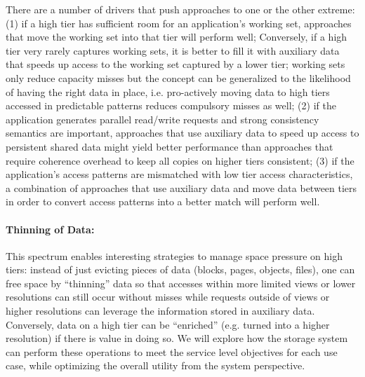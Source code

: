 There are a
number of drivers that push approaches to one or the other extreme:
(1) if a high tier has sufficient room for an application's working
set, approaches that move the working set into that tier will perform
well; Conversely, if a high tier very rarely captures working sets,
it is better to fill it with auxiliary data that speeds up access
to the working set captured by a lower tier; working sets only
reduce capacity misses but the concept can be generalized to the
likelihood of having the right data in place, i.e. pro-actively
moving data to high tiers accessed in predictable patterns reduces
compulsory misses as well; (2) if the application generates parallel
read/write requests and strong consistency semantics are important,
approaches that use auxiliary data to speed up access to persistent
shared data might yield better performance than approaches that
require coherence overhead to keep all copies on higher tiers
consistent; (3) if the application's access patterns are mismatched
with low tier access characteristics, a combination of approaches
that use auxiliary data and move data between tiers in order to
convert access patterns into a better match will perform well.

\paragraph{Thinning of Data:} 
This spectrum enables interesting strategies
to manage space pressure on high tiers: instead of just evicting
pieces of data (blocks, pages, objects, files), one can free space
by ``thinning'' data so that accesses within more limited views or
lower resolutions can still occur without misses while requests
outside of views or higher resolutions can leverage the information
stored in auxiliary data. Conversely, data on a high tier can be
``enriched'' (e.g. turned into a higher resolution) if there is
value in doing so. We will explore how the storage system can perform these
operations to meet the service level objectives for each use case, while
optimizing the overall utility from the system perspective. 

